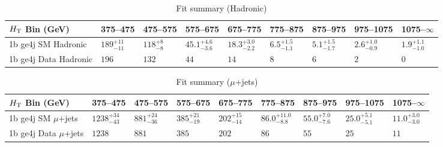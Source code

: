 \documentclass[8pt]{article}
\def\scalht{\mbox{$H_{\rm{T}}$}\xspace}
\newcommand\T{\rule{0pt}{2.6ex}}
\begin{document}
\begin{table}[ht!]
\caption{Fit summary (Hadronic)}
\label{tab:ensemble-summary}
\centering
\begin{tabular}{ lllllllll }

\hline
\scalht Bin (GeV)       & 375--475                       & 475--575                       & 575--675                       & 675--775                       & 775--875                       & 875--975                       & 975--1075                      & 1075--$\infty$                 \\ [1.000000ex]
\hline
1b ge4j SM Hadronic\T   & $189^{+11}_{-11}$              & $118^{+8}_{-8}$                & $45.1^{+4.6}_{-3.6}$           & $18.3^{+3.0}_{-2.2}$           & $6.5^{+1.5}_{-1.1}$            & $5.1^{+1.5}_{-1.7}$            & $2.6^{+1.0}_{-0.9}$            & $1.9^{+1.1}_{-1.0}$            \\ 
1b ge4j Data Hadronic\T & $196$                          & $132$                          & $44$                           & $14$                           & $8$                            & $6$                            & $2$                            & $0$                            \\ 
\hline

\end{tabular}
\end{table}
\begin{table}[ht!]
\caption{Fit summary ($\mu$+jets)}
\label{tab:ensemble-summary}
\centering
\begin{tabular}{ lllllllll }

\hline
\scalht Bin (GeV)       & 375--475                       & 475--575                       & 575--675                       & 675--775                       & 775--875                       & 875--975                       & 975--1075                      & 1075--$\infty$                 \\ [1.000000ex]
\hline
1b ge4j SM $\mu$+jets\T & $1238^{+34}_{-43}$             & $881^{+24}_{-36}$              & $385^{+21}_{-19}$              & $202^{+15}_{-14}$              & $86.0^{+11.0}_{-8.8}$          & $55.0^{+7.0}_{-7.6}$           & $25.0^{+5.1}_{-5.1}$           & $11.0^{+3.0}_{-3.0}$           \\ 
1b ge4j Data $\mu$+jets\T & $1238$                         & $881$                          & $385$                          & $202$                          & $86$                           & $55$                           & $25$                           & $11$                           \\ 
\hline

\end{tabular}
\end{table}
\end{document}
